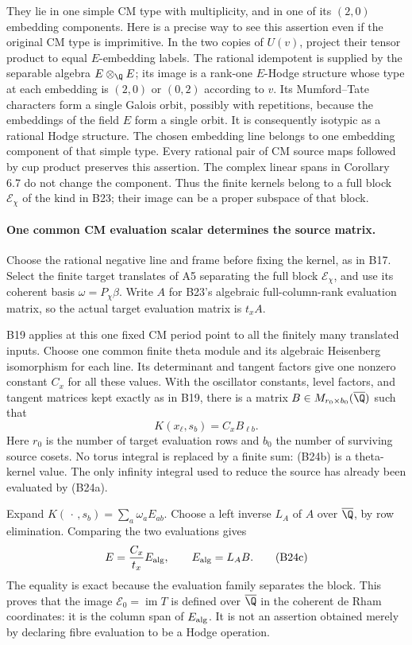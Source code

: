 They lie in one simple CM type with multiplicity,
and in one of its $(2,0)$ embedding components.
Here is a precise way to see this assertion even
if the original CM type is imprimitive.  In the
two copies of $U(v)$, project their tensor product
to equal $E$-embedding labels.  The rational
idempotent is supplied by the separable algebra
$E\otimes_\Q E$; its image is a rank-one
$E$-Hodge structure whose type at each embedding
is $(2,0)$ or $(0,2)$ according to $v$.  Its
Mumford--Tate characters form a single Galois
orbit, possibly with repetitions, because the
embeddings of the field $E$ form a single orbit.
It is consequently isotypic as a rational Hodge
structure.  The chosen embedding line belongs
to one embedding component of that simple type.
Every rational pair of CM source maps followed
by cup product preserves this assertion.
The complex linear spans in Corollary 6.7 do
not change the component.  Thus the finite
kernels belong to a full block
$\mathcal E_\chi$ of the kind in B23; their
image can be a proper subspace of that block.

\paragraph{One common CM evaluation scalar determines the source matrix.}
Choose the rational negative line and frame before
fixing the kernel, as in B17.  Select the finite
target translates of A5 separating the full block
$\mathcal E_\chi$, and use its coherent basis
$\omega=P_\chi\beta$.  Write $A$ for B23's
algebraic full-column-rank evaluation matrix, so
the actual target evaluation matrix is $t_xA$.

B19 applies at this one fixed CM period point
to all the finitely many translated inputs.
Choose one common finite theta module and its
algebraic Heisenberg isomorphism for each line.
Its determinant and tangent factors give one
nonzero constant $C_x$ for all these values.
With the oscillator constants, level factors,
and tangent matrices kept exactly as in B19,
there is a matrix $B\in M_{r_0\times b_0}(\overline\Q)$
such that
\[
       K(x_\ell,s_b)=C_x B_{\ell b}.
 \tag{B24b}
\]
Here $r_0$ is the number of target evaluation rows
and $b_0$ the number of surviving source cosets.
No torus integral is replaced by a finite sum:
(B24b) is a theta-kernel value.  The only
infinity integral used to reduce the source
has already been evaluated by (B24a).

Expand $K(\,\cdot\,,s_b)=\sum_a\omega_a E_{ab}$.
Choose a left inverse $L_A$ of $A$ over
$\overline\Q$, by row elimination.  Comparing
the two evaluations gives
\[
          E=\frac{C_x}{t_x}E_{\rm alg},
                  \qquad E_{\rm alg}=L_AB.
 \tag{B24c}
\]
The equality is exact because the evaluation
family separates the block.  This proves that
the image $\mathcal E_0=\operatorname{im}T$
is defined over $\overline\Q$ in the coherent
de Rham coordinates: it is the column span of
$E_{\rm alg}$.  It is not an assertion obtained
merely by declaring fibre evaluation to be a
Hodge operation.

